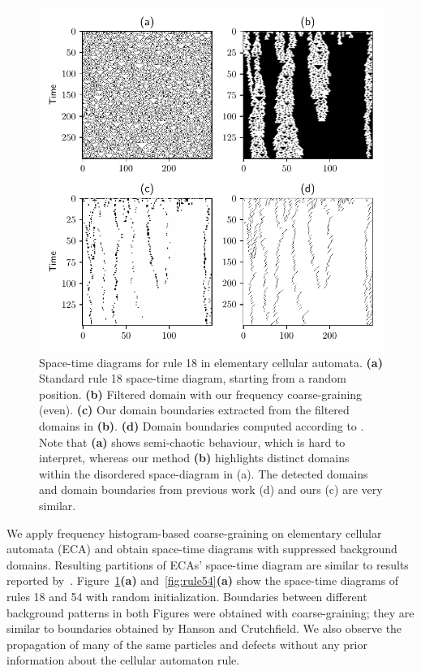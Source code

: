 \begin{figure}[htbp]
  \centering
  \includegraphics[width=\linewidth]{figures/rule18.pdf}
  \caption{\label{fig:rule18} Space-time diagrams for rule 18 in elementary
    cellular automata. \textbf{(a)} Standard rule 18 space-time diagram,
    starting from a random position. \textbf{(b)} Filtered domain with our
    frequency coarse-graining (even). \textbf{(c)} Our domain boundaries
    extracted from the filtered domains in \textbf{(b)}. \textbf{(d)} Domain
    boundaries computed according to
    \parencite{hansonAttractorbasinPortraitCellular1992}. Note that \textbf{(a)}
    shows semi-chaotic behaviour, which is hard to interpret, whereas our method
    \textbf{(b)} highlights distinct domains within the disordered space-diagram
    in (a). The detected domains and domain boundaries from previous work (d)
    and ours (c) are very similar.}
\end{figure}

We apply frequency histogram-based coarse-graining on elementary cellular
automata (ECA) and obtain space-time diagrams with suppressed background
domains. Resulting partitions of ECAs' space-time diagram are similar to results
reported by~\parencite{hansonAttractorbasinPortraitCellular1992,
  hansonComputationalMechanicsCellular1997}. Figure~\ref{fig:rule18}\textbf{(a)}
and~\ref{fig:rule54}\textbf{(a)} show the space-time diagrams of rules 18 and 54
with random initialization. Boundaries between different background patterns in
both Figures were obtained with coarse-graining; they are similar to boundaries
obtained by Hanson and Crutchfield. We also observe the propagation of many of
the same particles and defects without any prior information about the cellular
automaton rule.

